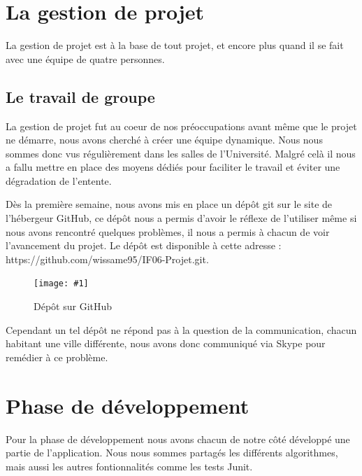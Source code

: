 ﻿\documentclass[a4paper,twoside,12pt]{report}
\newcommand{\monimage}[4]{
\par\noindent
\begin{figure}[H] %
\begin{center}
\texttt{[image: \#1]} %
\caption{#2} %
\label{#3} %
\end{center}
\end{figure} %
}
\begin{document}
\chapter{La gestion de projet}
%
\par
La gestion de projet est \`a la base de tout projet, et encore plus quand il se 
fait avec une \'equipe de quatre personnes.
\section{Le travail de groupe}
%
\par
La gestion de projet fut au coeur de nos pr\'eoccupations avant m\^eme que le projet 
ne d\'emarre, nous avons cherch\'e \`a cr\'eer une \'equipe dynamique. Nous nous sommes 
donc vus r\'eguli\`erement dans les salles de l'Universit\'e. Malgr\'e cel\`a il nous a 
fallu mettre en place des moyens d\'edi\'es pour faciliter le travail et \'eviter une 
d\'egradation de l'entente.
\par\noindent
 D\`es la premi\`ere semaine, nous avons mis en place un d\'ep\^ot git sur le site de 
l'h\'ebergeur GitHub, ce d\'ep\^ot nous a permis d'avoir le r\'eflexe de l'utiliser même 
 si nous avons rencontr\'e quelques probl\`emes, il nous a permis \`a chacun de voir 
l'avancement du projet. Le d\'ep\^ot est disponible \`a cette adresse : https://github.com/wissame95/IF06-Projet.git.
\monimage{DepotGit.png}{D\'epôt sur GitHub}{depot}{0.8}
\par\noindent
 Cependant un tel d\'ep\^ot ne r\'epond pas \`a la question de la communication, chacun 
habitant une ville diff\'erente, nous avons donc communiqu\'e via Skype pour 
rem\'edier \`a ce probl\`eme.

\chapter{Phase de d\'eveloppement}
%
\par
Pour la phase de d\'eveloppement nous avons chacun de notre c\^ot\'e d\'evelopp\'e une 
partie de l'application. Nous nous sommes partag\'es les diff\'erents 
algorithmes, mais aussi les autres fontionnalit\'es comme les tests Junit.
\end{document}
